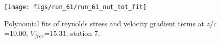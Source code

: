 \begin{figure}[H]
\centering
\texttt{[image: figs/run\_61/run\_61\_nut\_tot\_fit]}
\caption{Polynomial fits of reynolds stress and velocity gradient terms at $z/c$=10.00, $V_{free}$=15.31, station 7.}
\label{fig:run_61_nut_tot_fit}
\end{figure}


